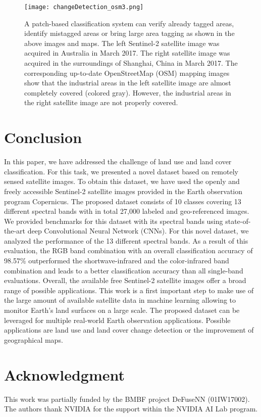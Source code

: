 \documentclass[journal]{IEEEtran}
\begin{document}
\begin{figure*}
	\centering
	\texttt{[image: changeDetection\_osm3.png]}
	\caption{A patch-based classification system can verify already tagged areas, identify mistagged areas or bring large area tagging as shown in the above images and maps. The left Sentinel-2 satellite image was acquired in Australia in March 2017. The right satellite image was acquired in the surroundings of Shanghai, China in March 2017. The corresponding up-to-date OpenStreetMap (OSM) mapping images show that the industrial areas in the left satellite image are almost completely covered (colored gray). However, the industrial areas in the right satellite image are not properly covered.}
\label{fig:changeDetection_osm}
\end{figure*}

\section{Conclusion}
In this paper, we have addressed the challenge of land use and land cover classification. For this task, we presented a novel dataset based on remotely sensed satellite images. To obtain this dataset, we have used the openly and freely accessible Sentinel-2 satellite images provided in the Earth observation program Copernicus. The proposed dataset consists of 10 classes covering 13 different spectral bands with in total 27,000 labeled and geo-referenced images. We provided benchmarks for this dataset with its spectral bands using state-of-the-art deep Convolutional Neural Network (CNNs). For this novel dataset, we analyzed the performance of the 13 different spectral bands. As a result of this evaluation, the RGB band combination with an overall classification accuracy of 98.57\% outperformed the shortwave-infrared and the color-infrared band combination and leads to a better classification accuracy than all single-band evaluations. Overall, the available free Sentinel-2 satellite images offer a broad range of possible applications. This work is a first important step to make use of the large amount of available satellite data in machine learning allowing to monitor Earth's land surfaces on a large scale. The proposed dataset can be leveraged for multiple real-world Earth observation applications. Possible applications are land use and land cover change detection or the improvement of geographical maps.

\appendices
\section*{Acknowledgment}
This work was partially funded by the BMBF project DeFuseNN (01IW17002). The authors thank NVIDIA for the support within the NVIDIA AI Lab program.
\end{document}
